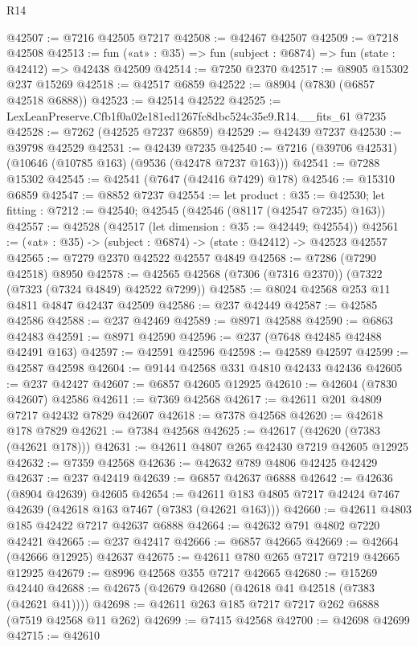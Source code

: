 \begin{lexlean}{R14}
\begin{coremodule}
@42507 := @7216 @42505 @7217
@42508 := @42467 @42507
@42509 := @7218 @42508
@42513 := fun («at» : @35) => fun (subject : @6874) => fun (state : @42412) => @42438 @42509
@42514 := @7250 @2370
@42517 := @8905 @15302 @237 @15269
@42518 := @42517 @6859
@42522 := @8904 (@7830 (@6857 @42518 @6888))
@42523 := @42514 @42522
@42525 := LexLeanPreserve.Cfb1f0a02e181ed1267fc8dbc524c35e9.R14.__fits_61 @7235
@42528 := @7262 (@42525 @7237 @6859)
@42529 := @42439 @7237
@42530 := @39798 @42529
@42531 := @42439 @7235
@42540 := @7216 (@39706 @42531) (@10646 (@10785 @163) (@9536 (@42478 @7237 @163)))
@42541 := @7288 @15302
@42545 := @42541 (@7647 (@42416 @7429) @178)
@42546 := @15310 @6859
@42547 := @8852 @7237
@42554 := let product : @35 := @42530;
  let fitting : @7212 := @42540; @42545 (@42546 (@8117 (@42547 @7235) @163))
@42557 := @42528 (@42517 (let dimension : @35 := @42449; @42554))
@42561 := («at» : @35) -> (subject : @6874) -> (state : @42412) -> @42523 @42557
@42565 := @7279 @2370 @42522 @42557 @4849
@42568 := @7286 (@7290 @42518) @8950
@42578 := @42565 @42568 (@7306 (@7316 @2370)) (@7322 (@7323 (@7324 @4849) @42522 @7299))
@42585 := @8024 @42568 @253 @11 @4811 @4847 @42437 @42509
@42586 := @237 @42449
@42587 := @42585 @42586
@42588 := @237 @42469
@42589 := @8971 @42588
@42590 := @6863 @42483
@42591 := @8971 @42590
@42596 := @237 (@7648 @42485 @42488 @42491 @163)
@42597 := @42591 @42596
@42598 := @42589 @42597
@42599 := @42587 @42598
@42604 := @9144 @42568 @331 @4810 @42433 @42436
@42605 := @237 @42427
@42607 := @6857 @42605 @12925
@42610 := @42604 (@7830 @42607) @42586
@42611 := @7369 @42568
@42617 := @42611 @201 @4809 @7217 @42432 @7829 @42607
@42618 := @7378 @42568
@42620 := @42618 @178 @7829
@42621 := @7384 @42568
@42625 := @42617 (@42620 (@7383 (@42621 @178)))
@42631 := @42611 @4807 @265 @42430 @7219 @42605 @12925
@42632 := @7359 @42568
@42636 := @42632 @789 @4806 @42425 @42429
@42637 := @237 @42419
@42639 := @6857 @42637 @6888
@42642 := @42636 (@8904 @42639) @42605
@42654 := @42611 @183 @4805 @7217 @42424 @7467 @42639 (@42618 @163 @7467 (@7383 (@42621 @163)))
@42660 := @42611 @4803 @185 @42422 @7217 @42637 @6888
@42664 := @42632 @791 @4802 @7220 @42421
@42665 := @237 @42417
@42666 := @6857 @42665
@42669 := @42664 (@42666 @12925) @42637
@42675 := @42611 @780 @265 @7217 @7219 @42665 @12925
@42679 := @8996 @42568 @355 @7217 @42665
@42680 := @15269 @42440
@42688 := @42675 (@42679 @42680 (@42618 @41 @42518 (@7383 (@42621 @41))))
@42698 := @42611 @263 @185 @7217 @7217 @262 @6888 (@7519 @42568 @11 @262)
@42699 := @7415 @42568
@42700 := @42698 @42699
@42715 := @42610

\end{coremodule}
\end{lexlean}
